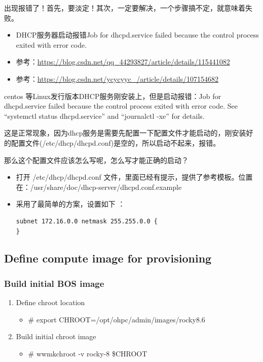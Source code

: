 {出现报错了！首先，要淡定！其次，一定要解决，一个步骤搞不定，就意味着失败。
\begin{itemize}
\item DHCP服务器启动报错Job for dhcpd.service failed because the control process exited with error code.
\item 参考：\url{https://blog.csdn.net/qq_44293827/article/details/115441082}
\item 参考：\url{https://blog.csdn.net/ycycyyc_/article/details/107154682}
\end{itemize}
centos 等Linux发行版本DHCP服务刚安装上，但是启动报错：Job for dhcpd.service failed because the control process exited with error code. See “systemctl status dhcpd.service” and “journalctl -xe” for details.

这是正常现象，因为dhcp服务是需要先配置一下配置文件才能启动的，刚安装好的配置文件(/etc/dhcp/dhcpd.conf)是空的，所以启动不起来，报错。

那么这个配置文件应该怎么写呢，怎么写才能正确的启动？

\begin{itemize}
\item 打开 /etc/dhcp/dhcpd.conf 文件，里面已经有提示，提供了参考模板。位置在：/usr/share/doc/dhcp-server/dhcpd.conf.example
\item 采用了最简单的方案，设置如下 ： 
\begin{verbatim}
subnet 172.16.0.0 netmask 255.255.0.0 {
}
\end{verbatim}
\end{itemize}


\subsection{Define compute image for provisioning}
\subsubsection{Build initial BOS image}
\begin{enumerate}
\item Define chroot location
\begin{itemize}
\item \# export CHROOT=/opt/ohpc/admin/images/rocky8.6
\end{itemize}

\item Build initial chroot image
\begin{itemize}
\item \# wwmkchroot -v rocky-8 \$CHROOT
\end{itemize}


\end{enumerate}}
